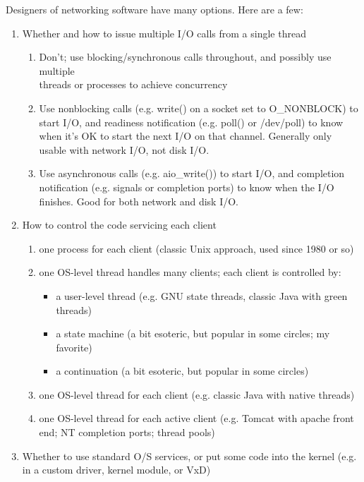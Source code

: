 \documentclass[twoside, xetex]{report}
\begin{document}
Designers of networking software have many options. Here are a few:

	\begin{enumerate}
	\item Whether and how to issue multiple I/O calls from a single thread
		\begin{enumerate}
		\item Don't; use blocking/synchronous calls throughout, and possibly use multiple \\threads or processes to 
		    achieve concurrency
		\item Use nonblocking calls (e.g. write() on a socket set to O\_NONBLOCK) to start I/O, and readiness 
		    notification (e.g. poll() or /dev/poll) to know when it's OK to start the next I/O on that channel. 
		    Generally only usable with network I/O, not disk I/O.
		\item Use asynchronous calls (e.g. aio\_write()) to start I/O, and completion notification (e.g. signals or 
			completion ports) to know when the I/O finishes. Good for both network and disk I/O.
		
		\end{enumerate}
	\item How to control the code servicing each client
		\begin{enumerate}
		\item one process for each client (classic Unix approach, used since 1980 or so)
		\item one OS-level thread handles many clients; each client is controlled by:
			
			\begin{itemize}
			\item a user-level thread (e.g. GNU state threads, classic Java with green \\threads)
			\item a state machine (a bit esoteric, but popular in some circles; my favorite)
			\item a continuation (a bit esoteric, but popular in some circles)
			\end{itemize}
		\item one OS-level thread for each client (e.g. classic Java with native threads)
		\item one OS-level thread for each active client (e.g. Tomcat with apache front end; NT completion ports; 
			thread pools)
		\end{enumerate}
	\item Whether to use standard O/S services, or put some code into the kernel (e.g. in a custom driver, kernel 
		module, or VxD)
	\end{enumerate}
	
\end{document}
